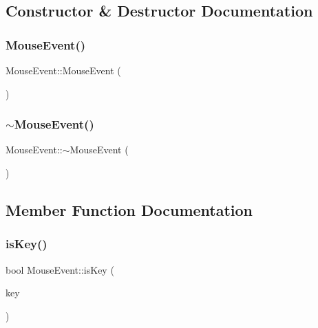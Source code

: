 \subsection{Constructor \& Destructor Documentation}
\mbox{\label{classsc_1_1_mouse_event_abc4315e7f7d9359fb17eaa066f6a4d13}} 
\subsubsection{\texorpdfstring{MouseEvent()}{MouseEvent()}}
{\footnotesize\ttfamily Mouse\+Event\+::\+Mouse\+Event (\begin{DoxyParamCaption}{ }\end{DoxyParamCaption})}

\mbox{\label{classsc_1_1_mouse_event_a964b5fc17ddbe6c98884c375d8f982b7}} 
\subsubsection{\texorpdfstring{$\sim$MouseEvent()}{~MouseEvent()}}
{\footnotesize\ttfamily Mouse\+Event\+::$\sim$\+Mouse\+Event (\begin{DoxyParamCaption}{ }\end{DoxyParamCaption})}



\subsection{Member Function Documentation}
\mbox{\label{classsc_1_1_mouse_event_a4547feedfd0a8ff93a86e8a2ed7d7fb2}} 
\subsubsection{\texorpdfstring{isKey()}{isKey()}}
{\footnotesize\ttfamily bool Mouse\+Event\+::is\+Key (\begin{DoxyParamCaption}\item[{const Mouse\+Keys \&}]{key }\end{DoxyParamCaption})}

